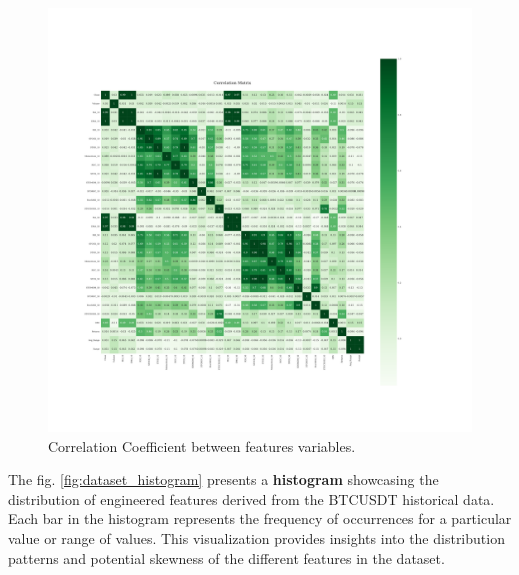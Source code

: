\begin{figure}[h]
\centering
\begin{adjustbox}{max width=1.2\textwidth,center}
    \includegraphics[scale=1.2, trim={30mm 70mm 50mm 110mm}, clip]{./pdf/correlation_matrix.pdf}
\end{adjustbox}
\caption{Correlation Coefficient between features variables.}
\label{fig:corr_coef}
\end{figure}

The fig. \ref{fig:dataset_histogram} presents a \textbf{histogram} showcasing the distribution of engineered features derived from the BTCUSDT historical data. Each bar in the histogram represents the frequency of occurrences for a particular value or range of values. This visualization provides insights into the distribution patterns and potential skewness of the different features in the dataset.



